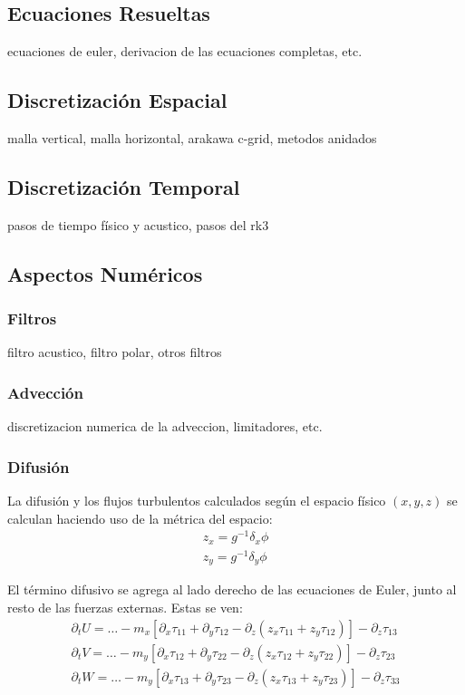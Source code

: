 \subsection{Ecuaciones Resueltas}
ecuaciones de euler, derivacion de las ecuaciones completas, etc.
\subsection{Discretización Espacial}
malla vertical, malla horizontal, arakawa c-grid, metodos anidados
\subsection{Discretización Temporal}
pasos de tiempo físico y acustico, pasos del rk3
\subsection{Aspectos Numéricos}
\subsubsection{Filtros}
filtro acustico, filtro polar, otros filtros
\subsubsection{Advección}
discretizacion numerica de la adveccion, limitadores, etc.
\subsubsection{Difusión}
La difusión y los flujos turbulentos calculados según el espacio físico $(x,y,z)$ se calculan haciendo uso de la métrica del espacio:
\begin{eqnarray}
z_x=g^{-1}\delta_x\phi \\
z_y=g^{-1}\delta_y\phi
\end{eqnarray}

El término difusivo se agrega al lado derecho de las ecuaciones de Euler, junto al resto de las fuerzas externas. Estas se ven:
\begin{eqnarray}
\partial_t U = \ldots - m_x[\partial_x\tau_{11}+\partial_y\tau_{12}-\partial_z(z_x\tau_{11}+z_y\tau_{12})]-\partial_z\tau_{13} \\
\partial_t V = \ldots - m_y[\partial_x\tau_{12}+\partial_y\tau_{22}-\partial_z(z_x\tau_{12}+z_y\tau_{22})]-\partial_z\tau_{23} \\
\partial_t W = \ldots - m_y[\partial_x\tau_{13}+\partial_y\tau_{23}-\partial_z(z_x\tau_{13}+z_y\tau_{23})]-\partial_z\tau_{33}
\end{eqnarray}

